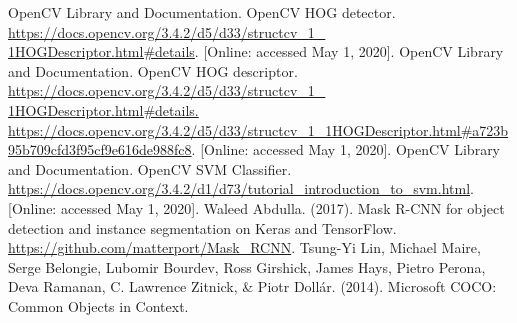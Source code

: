 \documentclass{article}
\begin{document}
\begin{thebibliography}{2}
 OpenCV Library and Documentation. OpenCV HOG detector.
\url{https://docs.opencv.org/3.4.2/d5/d33/structcv_1_
1HOGDescriptor.html#details}. [Online: accessed May 1, 2020].
 OpenCV Library and Documentation. OpenCV HOG descriptor.
\url{https://docs.opencv.org/3.4.2/d5/d33/structcv_1_
1HOGDescriptor.html#details. https://docs.opencv.org/3.4.2/d5/d33/structcv_1_1HOGDescriptor.html#a723b95b709cfd3f95cf9e616de988fc8}. [Online: accessed May 1, 2020].
 OpenCV Library and Documentation. OpenCV SVM Classifier. \url{https://docs.opencv.org/3.4.2/d1/d73/tutorial_introduction_to_svm.html}. [Online: accessed May 1, 2020].
 Waleed Abdulla. (2017). Mask R-CNN for object detection and instance segmentation on Keras and TensorFlow. \url{https://github.com/matterport/Mask_RCNN}.
 Tsung-Yi Lin, Michael Maire, Serge Belongie, Lubomir Bourdev, Ross Girshick, James Hays, Pietro Perona, Deva Ramanan, C. Lawrence Zitnick, \& Piotr Dollár. (2014). Microsoft COCO: Common Objects in Context.
\end{thebibliography}
\end{document}
